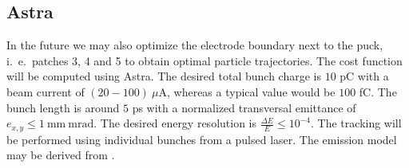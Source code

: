 \subsection{Astra}
In the future we may also optimize the electrode boundary next to the puck, i.~e.~patches 3, 4 and 5 to obtain optimal particle trajectories. The cost function will be computed using Astra.
The desired total bunch charge is $10$ pC with a beam current of $(20-100)\ \mu\mathrm{A}$, whereas a typical value would be $100$ fC. The bunch length is around $5$ ps with a normalized transversal emittance of $e_{x,y} \leq 1\ \mathrm{mm\ mrad}$. The desired energy resolution is $\frac{\Delta E}{E} \leq 10^{-4}$.
The tracking will be performed using individual bunches from a pulsed laser. The emission model may be derived from \cite{wagner}.
